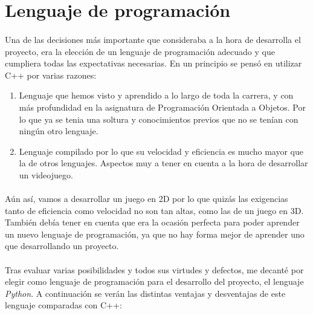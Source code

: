 \section{Lenguaje de programación}

\paragraph{}
Una de las decisiones más importante que consideraba a la hora de desarrolla el proyecto, era la elección de un lenguaje de 
programación adecuado y que cumpliera todas las expectativas necesarias. En un principio se pensó en utilizar C++ por varias 
razones:

\begin{enumerate}
    \item Lenguaje que hemos visto y aprendido a lo largo de toda la carrera, y con más profundidad en la asignatura de Programación
    Orientada a Objetos. Por lo que ya se tenia una soltura y conocimientos
    previos que no se tenían con ningún otro lenguaje.
    
    \item Lenguaje compilado por lo que su velocidad y eficiencia es mucho mayor que la de otros lenguajes. Aspectos 
    muy a tener en cuenta a la hora de desarrollar un videojuego.
\end{enumerate}

\paragraph{}
Aún así, vamos a desarrollar un juego en 2D por lo que quizás las exigencias tanto de eficiencia como velocidad no son tan altas,
como las de un juego en 3D. También debía tener en cuenta que era la ocasión perfecta para poder aprender un nuevo lenguaje de 
programación, ya que no hay forma mejor de aprender uno que desarrollando un proyecto.

\paragraph{}
Tras evaluar varias posibilidades y todos sus virtudes y defectos, me decanté por elegir como lenguaje de programación para el 
desarrollo del proyecto, el lenguaje \emph{Python}. A continuación se verán las distintas ventajas y desventajas de este lenguaje 
comparadas con C++:

